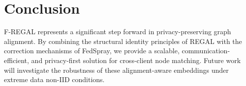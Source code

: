 \section{Conclusion}
F-REGAL represents a significant step forward in privacy-preserving graph alignment. By combining the structural identity principles of REGAL with the correction mechanisms of FedSpray, we provide a scalable, communication-efficient, and privacy-first solution for cross-client node matching. Future work will investigate the robustness of these alignment-aware embeddings under extreme data non-IID conditions.